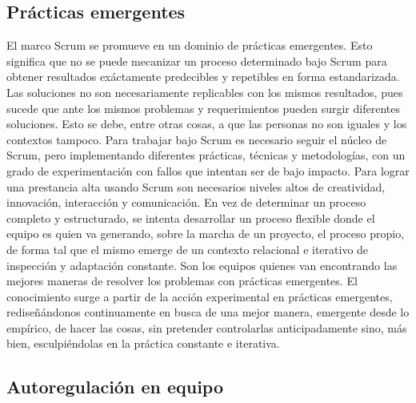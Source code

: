 \subsection{Prácticas emergentes}

El marco Scrum se promueve en un dominio de prácticas emergentes. Esto significa que no se puede mecanizar un proceso determinado bajo Scrum para obtener resultados exáctamente predecibles y repetibles en forma estandarizada. Las soluciones no son necesariamente replicables con los mismos resultados, pues sucede que ante los mismos problemas y requerimientos pueden surgir diferentes soluciones. Esto se debe, entre otras cosas, a que las personas no son iguales y los contextos tampoco. Para trabajar bajo Scrum es necesario seguir el núcleo de Scrum, pero implementando diferentes prácticas, técnicas y metodologías, con un grado de experimentación con fallos que intentan ser de bajo impacto. Para lograr una prestancia alta usando Scrum son necesarios niveles altos de creatividad, innovación, interacción y comunicación. En vez de determinar un proceso completo y estructurado, se intenta desarrollar un proceso flexible donde el equipo es quien va generando, sobre la marcha de un proyecto, el proceso propio, de forma tal que el mismo emerge de un contexto relacional e iterativo de inspección y adaptación constante. Son los equipos quienes van encontrando las mejores maneras de resolver los problemas con prácticas emergentes. El conocimiento surge a partir de la acción experimental en prácticas emergentes, rediseñándonos continuamente en busca de una mejor manera, emergente desde lo empírico, de hacer las cosas, sin pretender controlarlas anticipadamente sino, más bien, esculpiéndolas en la práctica constante e iterativa.


\subsection{Autoregulación en equipo}

